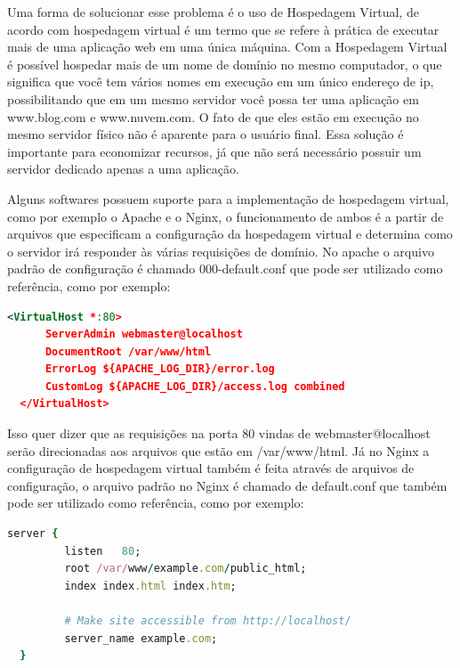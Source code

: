 Uma forma de solucionar esse problema é o uso de Hospedagem Virtual, de acordo com
\cite{apachvh} hospedagem virtual é um termo que se refere à prática de executar
mais de uma aplicação web em uma única máquina. Com a Hospedagem Virtual é possível
hospedar mais de um nome de domínio no mesmo computador, o que significa que você
tem vários nomes em execução em um único endereço de ip, possibilitando que em um
mesmo servidor você possa ter uma aplicação em www.blog.com e www.nuvem.com. O fato
de que eles estão em execução no mesmo servidor físico não é aparente para o usuário final. Essa
solução é importante para economizar recursos, já que não será necessário possuir
um servidor dedicado apenas a uma aplicação.

Alguns softwares possuem suporte para a implementação de hospedagem virtual, como por
exemplo o Apache e o Nginx, o funcionamento de ambos é a partir de arquivos que
especificam a configuração da hospedagem virtual e determina como o servidor
irá responder às várias requisições de domínio. No apache o arquivo padrão de configuração
é chamado 000-default.conf que pode ser utilizado como referência, como por exemplo:

\begin{lstlisting}[language=Xml,label=dice_index,caption={ Exemplo de arquivo de configuração de hospedagem virtual no apache}]
  <VirtualHost *:80>
      ServerAdmin webmaster@localhost
      DocumentRoot /var/www/html
      ErrorLog ${APACHE_LOG_DIR}/error.log
      CustomLog ${APACHE_LOG_DIR}/access.log combined
  </VirtualHost>
\end{lstlisting}

Isso quer dizer que as requisições na porta 80 vindas de webmaster@localhost serão
direcionadas aos arquivos que estão em /var/www/html. Já no Nginx a configuração
de hospedagem virtual também é feita através de arquivos de configuração, o arquivo
padrão no Nginx é chamado de default.conf que também pode ser utilizado como
referência, como por exemplo:

\begin{lstlisting}[language=Ruby,label=dice_index,caption={ Exemplo de arquivo de configuração de hospedagem virtual no Nginx}]
  server {
         listen   80;
         root /var/www/example.com/public_html;
         index index.html index.htm;

         # Make site accessible from http://localhost/
         server_name example.com;
  }
\end{lstlisting}

